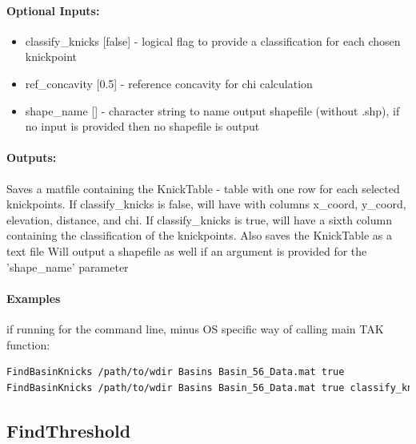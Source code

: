 \paragraph{Optional Inputs:}
\begin{itemize}
\item classify\_knicks [false] - logical flag to provide a classification for each chosen knickpoint
\item ref\_concavity [0.5] - reference concavity for chi calculation
\item shape\_name [] - character string to name output shapefile (without .shp), if no input is provided then
no shapefile is output
\end{itemize}

\paragraph{Outputs:}
Saves a matfile containing the KnickTable - table with one row for each selected knickpoints. If classify\_knicks is false, 
will have with columns x\_coord, y\_coord, elevation, distance, and chi. If classify\_knicks is true, will have a sixth 
column containing the classification of the knickpoints.
Also saves the KnickTable as a text file
Will output a shapefile as well if an argument is provided for the 'shape\_name' parameter

\paragraph{Examples} if running for the command line, minus OS specific way of calling main TAK function:
\begin{lstlisting}[language=bash]
FindBasinKnicks /path/to/wdir Basins Basin_56_Data.mat true
FindBasinKnicks /path/to/wdir Basins Basin_56_Data.mat true classify_knicks true
\end{lstlisting}

\subsection{FindThreshold}
